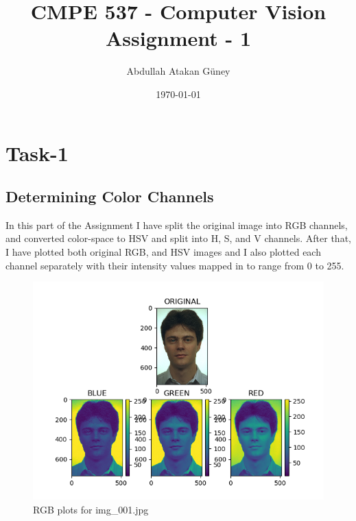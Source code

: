 \documentclass[11pt]{report}
\title{\textbf{CMPE 537 - Computer Vision} \\ Assignment - 1}
\author{Abdullah Atakan Güney}
\date{\today}
\begin{document}
\maketitle

\newpage

\tableofcontents

\newpage

\chapter{Task-1}
\section{Determining Color Channels}

In this part of the Assignment I have split the original image into RGB channels, and converted color-space to HSV and split into H, S, and V channels. After that, I have plotted both original RGB, and HSV images and I also plotted each channel separately with their intensity values mapped in to range from 0 to 255.

\begin{figure}
    \centering
    \includegraphics[height=0.4\textheight]{Task 1 Plots/RGB_plots.png}
    \caption{RGB plots for img\_001.jpg}
    \label{fig:rgb_all}
\end{figure}
\end{document}
